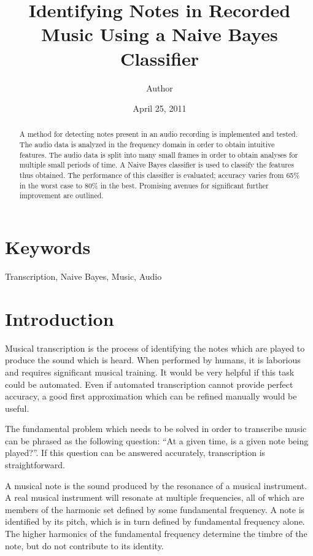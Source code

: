\documentclass[twocolumn]{article}
\title{Identifying Notes in Recorded Music Using a Naive Bayes Classifier}
\date{April 25, 2011}
\author{Author}
\begin{document}
\maketitle

\begin{abstract}
A method for detecting notes present in an audio recording is implemented and tested.  The audio data is analyzed in the frequency domain in order to obtain intuitive features.  The audio data is split into many small frames in order to obtain analyses for multiple small periods of time.  A Naive Bayes classifier is used to classify the features thus obtained.  The performance of this classifier is evaluated; accuracy varies from 65\% in the worst case to 80\% in the best.  Promising avenues for significant further improvement are outlined.
\end{abstract}

\section*{Keywords}
Transcription, Naive Bayes, Music, Audio

\section{Introduction}

Musical transcription is the process of identifying the notes which are played to produce the sound which is heard.  When performed by humans, it is laborious and requires significant musical training.  It would be very helpful if this task could be automated.  Even if automated transcription cannot provide perfect accuracy, a good first approximation which can be refined manually would be useful.

The fundamental problem which needs to be solved in order to transcribe music can be phrased as the following question: ``At a given time, is a given note being played?''.  If this question can be answered accurately, transcription is straightforward.

A musical note is the sound produced by the resonance of a musical instrument.  A real musical instrument will resonate at multiple frequencies, all of which are members of the harmonic set defined by some fundamental frequency.  A note is identified by its pitch, which is in turn defined by fundamental frequency alone.  The higher harmonics of the fundamental frequency determine the timbre of the note, but do not contribute to its identity.
\end{document}
